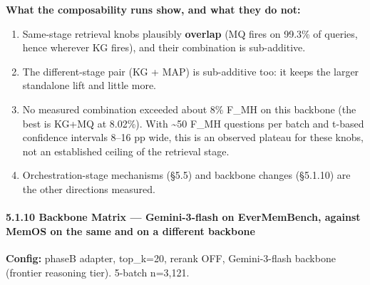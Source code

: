 \documentclass[
]{article}
\providecommand{\tightlist}{%
  \setlength{\itemsep}{0pt}\setlength{\parskip}{0pt}}
\begin{document}
\textbf{What the composability runs show, and what they do not:}

\begin{enumerate}
\def\labelenumi{\arabic{enumi}.}
\tightlist
\item
  Same-stage retrieval knobs plausibly \textbf{overlap} (MQ fires on
  99.3\% of queries, hence wherever KG fires), and their combination is
  sub-additive.
\item
  The different-stage pair (KG + MAP) is sub-additive too: it keeps the
  larger standalone lift and little more.
\item
  No measured combination exceeded about 8\% F\_MH on this backbone (the
  best is KG+MQ at 8.02\%). With \textasciitilde50 F\_MH questions per
  batch and t-based confidence intervals 8--16 pp wide, this is an
  observed plateau for these knobs, not an established ceiling of the
  retrieval stage.
\item
  Orchestration-stage mechanisms (§5.5) and backbone changes (§5.1.10)
  are the other directions measured.
\end{enumerate}

\paragraph{5.1.10 Backbone Matrix --- Gemini-3-flash on EverMemBench,
against MemOS on the same and on a different
backbone}\label{backbone-matrix-gemini-3-flash-on-evermembench-against-memos-on-the-same-and-on-a-different-backbone}

\textbf{Config:} phaseB adapter, top\_k=20, rerank OFF, Gemini-3-flash
backbone (frontier reasoning tier). 5-batch n=3,121.
\end{document}
